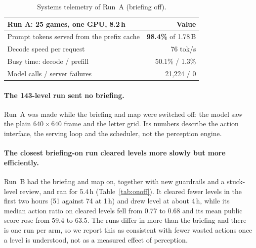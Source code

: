 \begin{table}[h]
\centering
\small
\begin{tabular}{@{}L{0.66\columnwidth}r@{}}
\toprule
Run A: 25 games, one GPU, 8.2\,h & Value \\
\midrule
Prompt tokens served from the prefix cache & \textbf{98.4\%} of 1.78\,B \\
Decode speed per request & 76 tok/s \\
Busy time: decode / prefill & 50.1\% / 1.3\% \\
Model calls / server failures & 21,224 / 0 \\
\bottomrule
\end{tabular}
\caption{Systems telemetry of Run~A (briefing off).}
\label{tab:telemetry}
\end{table}

\paragraph{The 143-level run sent no briefing.}
Run~A was made while the briefing and map were switched off: the model saw the plain $640{\times}640$ frame and the letter grid. Its numbers describe the action interface, the serving loop and the scheduler, not the perception engine.

\paragraph{The closest briefing-on run cleared levels more slowly but more efficiently.}
Run~B had the briefing and map on, together with new guardrails and a stuck-level review, and ran for 5.4\,h (Table~\ref{tab:onoff}). It cleared fewer levels in the first two hours (51 against 74 at 1\,h) and drew level at about 4\,h, while its median action ratio on cleared levels fell from 0.77 to 0.68 and its mean public score rose from 59.4 to 63.5. The runs differ in more than the briefing and there is one run per arm, so we report this as consistent with fewer wasted actions once a level is understood, not as a measured effect of perception.

